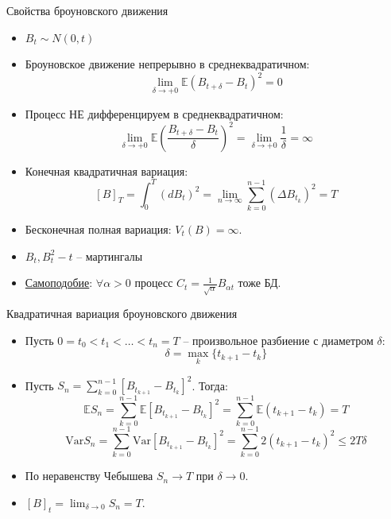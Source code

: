 \documentclass[aspectratio=169]{beamer}
\begin{document}
\begin{frame}{Свойства броуновского движения}
    \begin{itemize}
        \item $B_t \sim N(0, t)$
         
        \item Броуновское движение непрерывно в среднеквадратичном:
        $$
            \lim_{\delta \to +0}\mathbb{E} \left( B_{t+\delta} - B_t \right)^2 = 0
        $$
         
        \item Процесс НЕ дифференцируем в среднеквадратичном:
        $$
            \lim_{\delta \to +0}\mathbb{E} \left(\dfrac{ B_{t+\delta} - B_t }{\delta}\right)^2 = \lim_{\delta \to +0} \dfrac{1}{\delta}  = \infty
        $$
         
        \item Конечная квадратичная вариация:
        $$
            \left[ B \right]_T = \int_0^T (dB_t)^2 = \lim_{n\to \infty} \sum_{k=0}^{n-1} \left(\Delta B_{t_k}\right)^2 = T
        $$
        \item Бесконечная полная вариация: $V_t(B) = \infty$.
        \item $B_t, B_t^2-t$ -- мартингалы
        \item \href{https://ru.wikipedia.org/wiki/Винеровский_процесс#/media/Файл:Wiener_process_animated.gif}{Самоподобие}: $\forall \alpha > 0$  процесс $C_t = \frac{1}{\sqrt{\alpha}} B_{\alpha t}$ тоже БД.
    \end{itemize}
\end{frame}

\begin{frame}{Квадратичная вариация броуновского движения}
    \begin{itemize}
        \item Пусть $0 = t_0 < t_1 < \ldots < t_n = T$ -- произвольное разбиение с диаметром $\delta$: 
        $$\delta = \max_k \{t_{k+1} - t_k\}$$
        \item Пусть $S_n = \sum_{k=0}^{n-1} \left[B_{t_{k+1}} - B_{t_k}\right]^2$. Тогда:
        $$\mathbb{E} S_n = \sum_{k=0}^{n-1} \mathbb{E} \left[B_{t_{k+1}} - B_{t_k}\right]^2
        = \sum_{k=0}^{n-1} \mathbb{E} (t_{k+1}-t_k) = T$$
        $$\mathrm{Var} S_n = \sum_{k=0}^{n-1} \mathrm{Var} \left[B_{t_{k+1}} - B_{t_k}\right]^2
        = \sum_{k=0}^{n-1} 2 (t_{k+1}-t_k)^2 \leq 2 T \delta$$
        
        \item По неравенству Чебышева $S_n \to T$ при $\delta \to 0$.
        \item $[B]_t = \lim_{\delta\to 0} S_n = T$.
    \end{itemize}
\end{frame}
\end{document}
